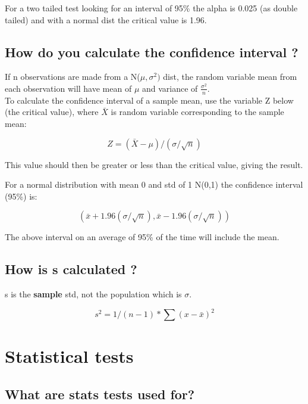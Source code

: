 \documentclass[11pt]{scrartcl} %
\begin{document}
For a two tailed test looking for an interval of 95\% the alpha is 0.025 (as double tailed) and 
with a normal dist the critical value is 1.96.

\subsection{How do you calculate the confidence interval
?}

If n observations are made from a N(\(\mu,\sigma^2)\) dist, the random variable mean from each observation will have
mean of \(\mu\) and variance of \(\frac{\sigma^2}{n}\).\\

To calculate the confidence interval of a sample mean, use the
variable Z below (the critical value), where \(\bar{X}\) is random variable corresponding to the
sample mean:

\begin{equation}
	Z = (\bar{X} - \mu)/ (\sigma/ \sqrt{n})
\end{equation}

This value should then be greater or less than the critical value, giving the result.

For a normal distribution with mean 0 and std of 1 N(0,1) the confidence
interval (95\%) is:

\begin{equation}
	(\bar{x} + 1.96 (\sigma/\sqrt{n}),\bar{x} - 1.96 (\sigma/\sqrt{n}))
\end{equation}

The above interval on an average of 95\% of the time will include the
mean.

\subsection{How is s calculated ?}

s is the \textbf{sample} std, not the population which is \(\sigma\).

\begin{equation}
	s^2 = 1/(n-1) * \sum(x-\bar{x})^2
\end{equation}

\section{Statistical tests}

\subsection{What are stats tests used for?}
\end{document}
